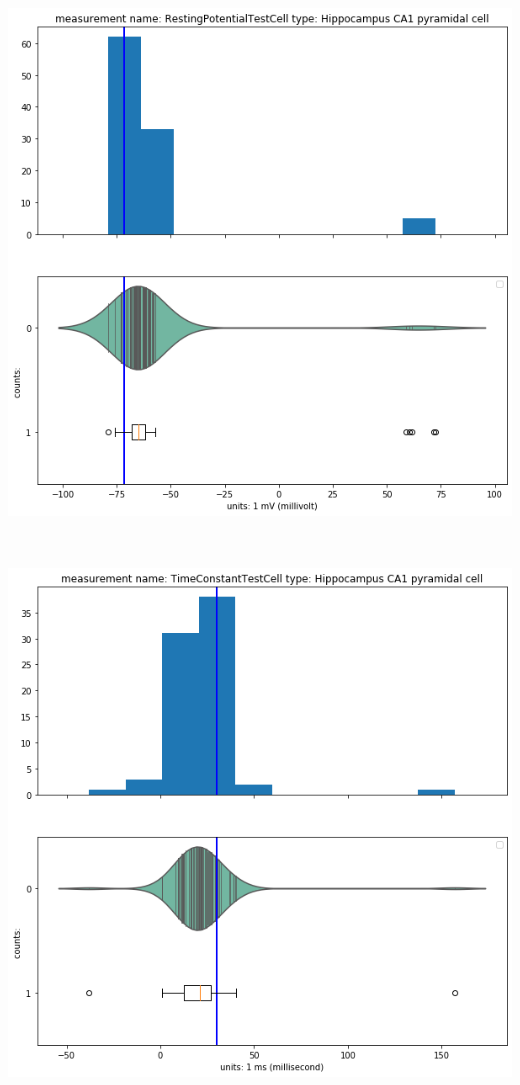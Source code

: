     \begin{center}
    \includegraphics[width=0.7\linewidth]{notebooks_converted/needata_thesis_files/needata_thesis_5_29}
    \end{center}
    { \hspace*{\fill} \\}
    
    \begin{center}
    \includegraphics[width=0.7\linewidth]{notebooks_converted/needata_thesis_files/needata_thesis_5_30}
    \end{center}
    { \hspace*{\fill} \\}
    
